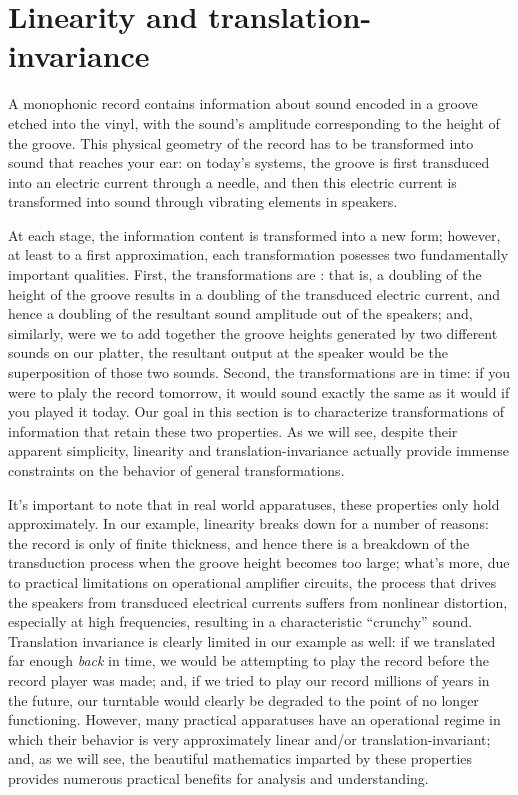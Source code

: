 

\chapter{Linearity and translation-invariance}

A monophonic record contains information about sound encoded in a groove etched into the vinyl, with the sound's amplitude corresponding to the height of the groove. This physical geometry of the record has to be transformed into sound that reaches your ear: on today's systems, the groove is first transduced into an electric current through a needle, and then this electric current is transformed into sound through vibrating elements in speakers.

At each stage, the information content is transformed into a new form; however, at least to a first approximation, each transformation posesses two fundamentally important qualities. First, the transformations are : that is, a doubling of the height of the groove results in a doubling of the transduced electric current, and hence a doubling of the resultant sound amplitude out of the speakers; and, similarly, were we to add together the groove heights generated by two different sounds on our platter, the resultant output at the speaker would be the superposition of those two sounds. Second, the transformations are  in time: if you were to plaly the record tomorrow, it would sound exactly the same as it would if you played it today. Our goal in this section is to characterize transformations of information that retain these two properties. As we will see, despite their apparent simplicity, linearity and translation-invariance actually provide immense constraints on the behavior of general transformations.

It's important to note that in real world apparatuses, these properties only hold approximately. In our example, linearity breaks down for a number of reasons: the record is only of finite thickness, and hence there is a breakdown of the transduction process when the groove height becomes too large; what's more, due to practical limitations on operational amplifier circuits, the process that drives the speakers from transduced electrical currents suffers from nonlinear distortion, especially at high frequencies, resulting in a characteristic ``crunchy'' sound. Translation invariance is clearly limited in our example as well: if we translated far enough \emph{back} in time, we would be attempting to play the record before the record player was made; and, if we tried to play our record millions of years in the future, our turntable would clearly be degraded to the point of no longer functioning. However, many practical apparatuses have an operational regime in which their behavior is very approximately linear and/or translation-invariant; and, as we will see, the beautiful mathematics imparted by these properties provides numerous practical benefits for analysis and understanding.

